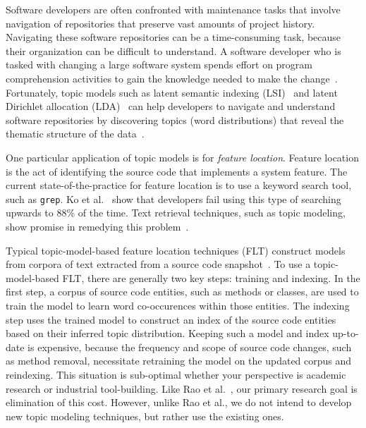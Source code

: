
Software developers are often confronted with maintenance tasks that involve navigation of repositories that preserve vast amounts of project history.
Navigating these software repositories can be a time-consuming task, because their organization can be difficult to understand.
A software developer who is tasked with changing a large software system spends effort on program comprehension activities to gain the knowledge needed to make the change~\cite{Corbi:1989}.
Fortunately, topic models such as
latent semantic indexing (LSI)~\cite{Deerwester-etal:1990} and
latent Dirichlet allocation (LDA)~\cite{Blei-etal:2003}
can help developers to navigate and understand software repositories
by discovering topics (word distributions) that reveal the thematic structure
of the data~\cite{Linstead-etal:2007,Thomas-etal:2011,Hindle-etal:2012}.

One particular application of topic models is for \emph{feature location}.
Feature location is the act of identifying the source code that implements a system feature.
The current state-of-the-practice for feature location is to use a keyword search tool, such as \texttt{grep}.
Ko et al.~\cite{Ko-etal:2006} show that developers fail using this type of searching upwards to 88\% of the time.
Text retrieval techniques, such as topic modeling, show promise in remedying this problem~\cite{Marcus-etal:2004}.

Typical topic-model-based feature location techniques (FLT) construct models from corpora of text extracted from a source code snapshot~\cite{Dit-etal:2013b}.
To use a topic-model-based FLT, there are generally two key steps: training and indexing.
In the first step, a corpus of source code entities, such as methods or classes, are used to train the model to learn word co-occurences within those entities.
The indexing step uses the trained model to construct an index of the source code entities based on their inferred topic distribution.
Keeping such a model and index up-to-date is expensive, because the frequency and scope of source code changes, such as method removal, necessitate retraining the model on the updated corpus and reindexing.
This situation is sub-optimal whether your perspective is academic research or industrial tool-building.
Like Rao et al.~\cite{Rao-etal:2013}, our primary research goal is elimination of this cost.
However, unlike Rao et al., we do not intend to develop new topic modeling techniques,
but rather use the existing ones.

